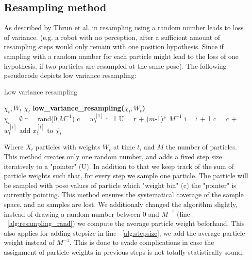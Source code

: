 \documentclass[	DIV=calc,%
							paper=a4,%
							fontsize=9pt,%
							twocolumn]{scrartcl}	 					%
\begin{document}
\subsection{Resampling method}
As described by Thrun et al. in \cite{ProbabilisticRobotics} resampling using a random number leads to loss of variance. (e.g. a robot with no perception, after a sufficient amount of resampling steps would only remain with one position hypothesis. Since if sampling with a random number for each particle might lead to the loss of one hypothesis, if two particles are resampled at the same pose).
The following pseudocode depicts low variance resampling:\\
\begin{algorithm}[h!]
\caption{Low variance resampling}
\begin{algorithmic}[1]
$\chi_{t},W_t $
$\bar{\chi_t}$
\STATE \textbf{low\_variance\_resampling(}$\chi_{t},W_t$\textbf{)}\\
\STATE  $\bar{\chi_t} =  \emptyset$
\STATE r = rand(0;$M^{-1}$)\label{alg:resampling_rand}
\STATE c = $w^{[1]}_t$
\STATE  i=1
\STATE U = r + ($m$-1)* $M^{-1}$\label{alg:stepsize}
\STATE i = i + 1\;
\STATE c = c + $w^{[i]}_t$
\ENDWHILE
\STATE  add $x^{[i]}_t$ to $\bar{\chi_t}$
\ENDFOR
\end{algorithmic}
\end{algorithm}

Where $X_t$ particles with weights $W_t$ at time $t$, and $M$ the number of particles.
This method creates only one random number, and adds a fixed step size iteratively to a "pointer" (U).
In addition to that we keep track of the sum of particle weights such that, for every step we sample one particle. The particle will be sampled with pose values of particle which "weight bin" (c) the "pointer" is currently pointing. 
This method ensures the systematical coverage of the sample space, and no samples are lost.
We additionaly changed the algorithm slightly, instead of drawing a random number between 0 and $M^{-1}$ (line ~\ref{alg:resampling_rand}) we compute the average particle weight beforhand. This also applies for adding stepsize in line ~\ref{alg:stepsize}, we add the average particle weight instead of $M^{-1}$. This is done to evade complications in case the assignment of particle weights in previous steps is not totally statistically sound.
\end{document}
